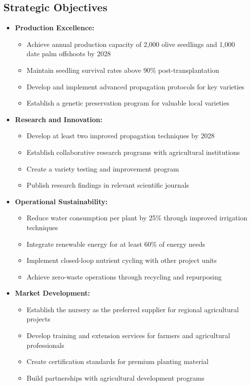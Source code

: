 \subsection{Strategic Objectives}
\begin{itemize}
    \item \textbf{Production Excellence:}
    \begin{itemize}
        \item Achieve annual production capacity of 2,000 olive seedlings and 1,000 date palm offshoots by 2028
        \item Maintain seedling survival rates above 90\% post-transplantation
        \item Develop and implement advanced propagation protocols for key varieties
        \item Establish a genetic preservation program for valuable local varieties
    \end{itemize}
    
    \item \textbf{Research and Innovation:}
    \begin{itemize}
        \item Develop at least two improved propagation techniques by 2028
        \item Establish collaborative research programs with agricultural institutions
        \item Create a variety testing and improvement program
        \item Publish research findings in relevant scientific journals
    \end{itemize}
    
    \item \textbf{Operational Sustainability:}
    \begin{itemize}
        \item Reduce water consumption per plant by 25\% through improved irrigation techniques
        \item Integrate renewable energy for at least 60\% of energy needs
        \item Implement closed-loop nutrient cycling with other project units
        \item Achieve zero-waste operations through recycling and repurposing
    \end{itemize}
    
    \item \textbf{Market Development:}
    \begin{itemize}
        \item Establish the nursery as the preferred supplier for regional agricultural projects
        \item Develop training and extension services for farmers and agricultural professionals
        \item Create certification standards for premium planting material
        \item Build partnerships with agricultural development programs
    \end{itemize}
\end{itemize}

